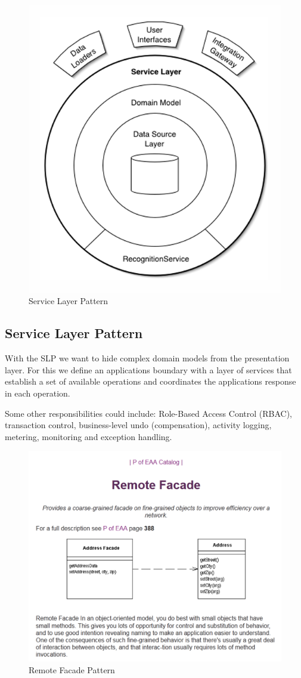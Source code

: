 \documentclass[../Main.tex]{subfiles}
\begin{document}
\begin{figure}[H]
    \centering
    \includegraphics[width=0.25\linewidth]{Images/service-layer-pattern.png}
    \caption{Service Layer Pattern}
\end{figure}

\subsection{Service Layer Pattern}
With the SLP we want to hide complex domain models from the presentation layer.
For this we define an applications boundary with a layer of services that establish a set of available operations
and coordinates the applications response in each operation.

Some other responsibilities could include: Role-Based Access Control (RBAC), transaction control, business-level undo (compensation),
activity logging, metering, monitoring and exception handling.
\newpage

\begin{figure}[H]
    \centering
    \includegraphics[width=0.6\linewidth]{Images/remote-facade.png}
    \caption{Remote Facade Pattern}
\end{figure}
\end{document}
